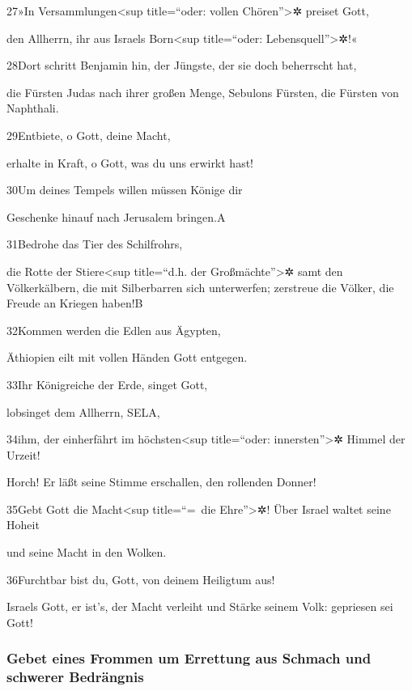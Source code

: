 27»In Versammlungen\textless sup title=``oder: vollen
Chören''\textgreater✲ preiset Gott,

den Allherrn, ihr aus Israels Born\textless sup title=``oder:
Lebensquell''\textgreater✲!«

28Dort schritt Benjamin hin, der Jüngste, der sie doch beherrscht hat,

die Fürsten Judas nach ihrer großen Menge, Sebulons Fürsten, die Fürsten
von Naphthali.

29Entbiete, o Gott, deine Macht,

erhalte in Kraft, o Gott, was du uns erwirkt hast!

30Um deines Tempels willen müssen Könige dir

Geschenke hinauf nach Jerusalem bringen.{A}

31Bedrohe das Tier des Schilfrohrs,

die Rotte der Stiere\textless sup title=``d.h. der
Großmächte''\textgreater✲ samt den Völkerkälbern, die mit Silberbarren
sich unterwerfen; zerstreue die Völker, die Freude an Kriegen haben!{B}

32Kommen werden die Edlen aus Ägypten,

Äthiopien eilt mit vollen Händen Gott entgegen.

33Ihr Königreiche der Erde, singet Gott,

lobsinget dem Allherrn, SELA,

34ihm, der einherfährt im höchsten\textless sup title=``oder:
innersten''\textgreater✲ Himmel der Urzeit!

Horch! Er läßt seine Stimme erschallen, den rollenden Donner!

35Gebt Gott die Macht\textless sup title=``=~die Ehre''\textgreater✲!
Über Israel waltet seine Hoheit

und seine Macht in den Wolken.

36Furchtbar bist du, Gott, von deinem Heiligtum aus!

Israels Gott, er ist's, der Macht verleiht und Stärke seinem Volk:
gepriesen sei Gott!

\hypertarget{gebet-eines-frommen-um-errettung-aus-schmach-und-schwerer-bedruxe4ngnis}{%
\subsubsection{Gebet eines Frommen um Errettung aus Schmach und schwerer
Bedrängnis}\label{gebet-eines-frommen-um-errettung-aus-schmach-und-schwerer-bedruxe4ngnis}}

